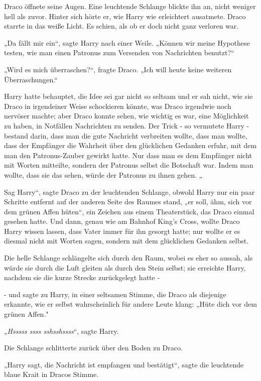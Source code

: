 {Draco öffnete seine Augen. Eine leuchtende Schlange blickte ihn an, nicht weniger hell als zuvor. Hinter sich hörte er, wie Harry wie erleichtert ausatmete. Draco starrte in das weiße Licht. Es schien, als ob er doch nicht ganz verloren war.

„Da fällt mir ein“, sagte Harry nach einer Weile. „Können wir meine Hypothese testen, wie man einen Patronus zum Versenden von Nachrichten benutzt?“

„Wird es mich überraschen?“, fragte Draco. „Ich will heute keine weiteren Überraschungen.“

Harry hatte behauptet, die Idee sei gar nicht so seltsam und er sah nicht, wie sie Draco in irgendeiner Weise schockieren könnte, was Draco irgendwie noch nervöser machte; aber Draco konnte sehen, wie wichtig es war, eine Möglichkeit zu haben, in Notfällen Nachrichten zu senden. Der Trick - so vermutete Harry - bestand darin, dass man die gute Nachricht verbreiten wollte, dass man wollte, dass der Empfänger die Wahrheit über den glücklichen Gedanken erfuhr, mit dem man den Patronus-Zauber gewirkt hatte. Nur dass man es dem Empfänger nicht mit Worten mitteilte, sondern der Patronus selbst die Botschaft war. Indem man wollte, dass sie das sehen, würde der Patronus zu ihnen gehen. „

Sag Harry“, sagte Draco zu der leuchtenden Schlange, obwohl Harry nur ein paar Schritte entfernt auf der anderen Seite des Raumes stand, „er soll, ähm, sich vor dem grünen Affen hüten“, ein Zeichen aus einem Theaterstück, das Draco einmal gesehen hatte. Und dann, genau wie am Bahnhof King's Cross, wollte Draco Harry wissen lassen, dass Vater immer für ihn gesorgt hatte; nur wollte er es diesmal nicht mit Worten sagen, sondern mit dem glücklichen Gedanken selbst.

Die helle Schlange schlängelte sich durch den Raum, wobei es eher so aussah, als würde sie durch die Luft gleiten als durch den Stein selbst; sie erreichte Harry, nachdem sie die kurze Strecke zurückgelegt hatte -

- und sagte zu Harry, in einer seltsamen Stimme, die Draco als diejenige erkannte, wie er selbst wahrscheinlich für andere Leute klang: „Hüte dich vor dem grünen Affen."

„\emph{Hsssss ssss sshsshssss}“, sagte Harry.

Die Schlange schlitterte zurück über den Boden zu Draco.

„Harry sagt, die Nachricht ist empfangen und bestätigt“, sagte die leuchtende blaue Krait in Dracos Stimme.

}
